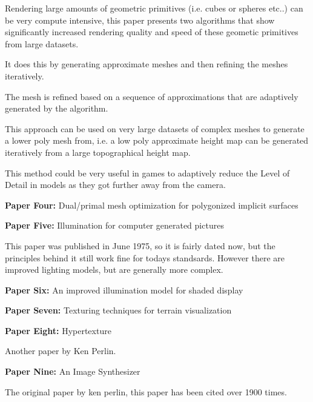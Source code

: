 \documentclass{scrartcl}
\begin{document}
Rendering large amounts  of geometric primitives (i.e. cubes or spheres etc..) can be very compute intensive, this paper presents two algorithms that show significantly increased rendering quality and speed of these geometic primitives from large datasets.

It does this by generating approximate meshes and then refining the meshes iteratively. 

The mesh is refined based on a sequence of approximations that are adaptively generated by the algorithm.

This approach can be used on very large datasets of complex meshes to generate a lower poly mesh from, i.e. a low poly approximate height map can be generated iteratively from a large topographical height map.

This method could be very useful in games to adaptively reduce the Level of Detail in models as they got further away from the camera.






\textbf{Paper Four:}
Dual/primal mesh optimization for polygonized implicit surfaces
\cite{ohtake2002dual}
\par

\textbf{Paper Five:}
Illumination for computer generated pictures
\cite{phong1975illumination}
\par

This paper was published in June 1975, so it is fairly dated now, but the principles behind it still work fine for todays standsards. However there are improved lighting models, but are generally more complex.






\par
\textbf{Paper Six:}
An improved illumination model for shaded display
\cite{whitted2005improved}
\par





\textbf{Paper Seven:}
Texturing techniques for terrain visualization
\cite{dollner2000texturing}
\par





\textbf{Paper Eight:}
Hypertexture
\cite{perlin1989hypertexture}
\par

Another paper by Ken Perlin.

\par
\textbf{Paper Nine:}
An Image Synthesizer
\cite{perlin1985image}
\par

The original paper by ken perlin, this paper has been cited over 1900 times.



\end{document}
